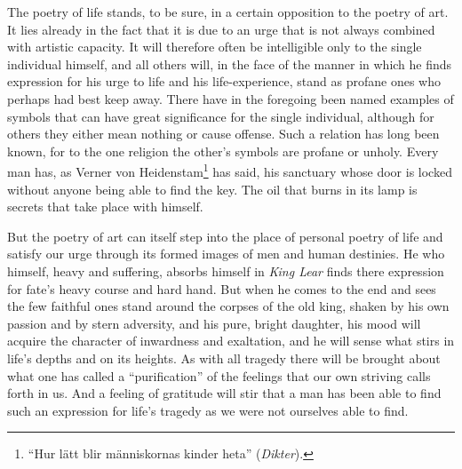 \documentclass[12pt]{book}
\newcommand{\opage}[1]{\marginnote{\footnotesize\textit{[#1]}}}
\begin{document}
The poetry of life stands, to be sure, in a certain opposition to the poetry of art. It lies already in the
fact that it is due to an urge that is not always combined with artistic capacity. It will therefore often be
intelligible only to the single individual himself, and all others will, in the face of the manner in which he
finds \opage{120}expression for his urge to life and his life-experience, stand as profane ones who perhaps had best keep
away. There have in the foregoing been named examples of symbols that can have great significance for the
single individual, although for others they either mean nothing or cause offense. Such a relation has long
been known, for to the one religion the other's symbols are profane or unholy. Every man has, as Verner von
Heidenstam\footnote{``Hur lätt blir människornas kinder heta'' (\textit{Dikter}).} has said, his sanctuary
whose door is locked without anyone being able to find the key. The oil that burns in its lamp is secrets that
take place with himself.

But the poetry of art can itself step into the place of personal poetry of life and satisfy our urge through
its formed images of men and human destinies. He who himself, heavy and suffering, absorbs himself in
\textit{King Lear} finds there expression for fate's heavy course and hard hand. But when he comes to the end
and sees the few faithful ones stand around the corpses of the old king, shaken by his own passion and by
stern adversity, and his pure, bright daughter, his mood will acquire the character of inwardness and
exaltation, and he will sense what stirs in life's depths and on its heights. As with all tragedy there will
be brought about what one has called a ``purification'' of the feelings that our own striving calls forth in
us. And a feeling of gratitude will stir that a man has been able to find such an expression for life's
tragedy as we were not ourselves able to find.
\end{document}
